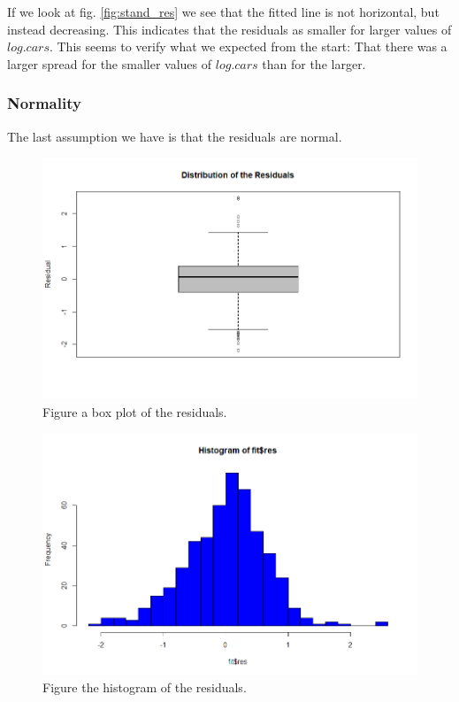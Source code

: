 \documentclass[a4paper,norsk, 10pt]{article}
\begin{document}
If we look at fig. \ref{fig:stand_res} we see that the fitted line is not horizontal, but instead decreasing. This indicates that the residuals as smaller for larger values of $log.cars$. This seems to verify what we expected from the start: That there was a larger spread for the smaller values of $log.cars$ than for the larger.


\subsubsection*{Normality} 
The last assumption we have is that the residuals are normal. 

\begin{figure}[!htbp]
\centering
\includegraphics[scale=0.5]{res_box.png}
\caption{Figure a box plot of the residuals.}\label{fig:res_box}
\end{figure}

\begin{figure}[!htbp]
\centering
\includegraphics[scale=0.5]{res_hist.png}
\caption{Figure the histogram of the residuals.}\label{fig:res_hist}
\end{figure}
\end{document}

